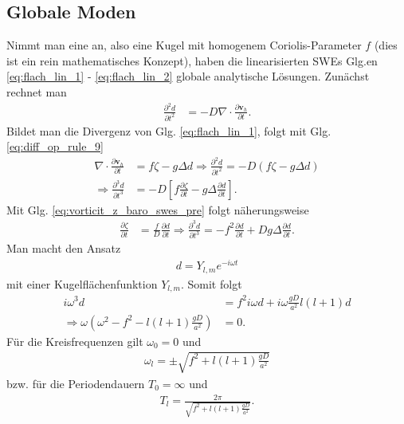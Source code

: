\subsection{Globale Moden}
\label{sec:globale_moden}

Nimmt man eine  an, also eine Kugel mit homogenem Coriolis-Parameter $f$ (dies ist ein rein mathematisches Konzept), haben die linearisierten SWEs Glg.en \eqref{eq:flach_lin_1} - \eqref{eq:flach_lin_2} globale analytische Lösungen. Zunächst rechnet man
%
\begin{align}
\frac{\partial^2d}{\partial t^2} &= -D\nabla\cdot\frac{\partial\mathbf{v}_h}{\partial t}.
\end{align}
%
Bildet man die Divergenz von Glg. \eqref{eq:flach_lin_1}, folgt mit Glg. \eqref{eq:diff_op_rule_9}
%
\begin{align}
\nabla\cdot\frac{\partial\mathbf{v}_h}{\partial t} &= f\zeta - g\Delta d\Rightarrow\frac{\partial^2d}{\partial t^2} = -D\left(f\zeta - g\Delta d\right)\nonumber\\
\Rightarrow\frac{\partial^3d}{\partial t^3}&= -D\left[f\frac{\partial\zeta}{\partial t} - g\Delta\frac{\partial d}{\partial t}\right].
\end{align}
%
Mit Glg. \eqref{eq:vorticit_z_baro_swes_pre} folgt näherungsweise
%
\begin{align}
\frac{\partial\zeta}{\partial t} &= \frac{f}{D}\frac{\partial d}{\partial t}\Rightarrow\frac{\partial^3 d}{\partial t^3} = -f^2\frac{\partial d}{\partial t} + Dg\Delta\frac{\partial d}{\partial t}.
\end{align}
%
Man macht den Ansatz
%
\begin{align}
d = Y_{l, m}e^{-i\omega t}
\end{align}
%
mit einer Kugelflächenfunktion $Y_{l, m}$. Somit folgt
%
\begin{align}
i\omega^3d &= f^2i\omega d + i\omega\frac{gD}{a^2}l\left(l + 1\right)d\nonumber\\
\Rightarrow\omega\left(\omega^2 - f^2 - l\left(l + 1\right)\frac{gD}{a^2}\right) &= 0.\label{eq:disprel_global_modes}
\end{align}
%
Für die Kreisfrequenzen gilt $\omega_0 = 0$ und
%
\begin{align}
\omega_l = \pm\sqrt{f^2 + l\left(l + 1\right)\frac{gD}{a^2}}
\end{align}
%
bzw. für die Periodendauern $T_0 = \infty$ und
%
\begin{align}
T_l = \frac{2\pi}{\sqrt{f^2 + l\left(l + 1\right)\frac{gD}{a^2}}}.
\end{align}

